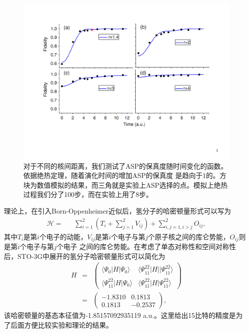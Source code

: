 \begin{figure}[htbp]
            \begin{center}
              \includegraphics[width= 0.8\columnwidth]{figures/nmrhydroasp.pdf}
              \caption{对于不同的核间距离，我们测试了ASP的保真度随时间变化的函数。依据绝热定理，随着演化时间的增加ASP的保真度
              是趋向于1的。方块为数值模拟的结果，而三角就是实验上ASP选择的点。模拟上绝热过程我们分了100步，而在实验上用了8步。}\label{nmrhydroasp}
            \end{center}
 \end{figure}
理论上，在引入Born-Oppenheimer近似后，氢分子的哈密顿量形式可以写为
 \begin{eqnarray}
\mathcal{H}=&&\sum\limits_{i=1}^2 (T_i+\sum\limits_{j=1}^2V_{ij})+\sum\limits_{i,j=1,i>j}^2O_{ij},
\end{eqnarray}
其中$T_i$是第$i$个电子的动能，$V_{ij}$是第$i$个电子与第$j$个原子核之间的库仑势能，$O_{ij}$则是第$i$个电子与第$j$个电子
之间的库仑势能。在考虑了单态对称性和空间对称性后，STO-3G中展开的氢分子哈密顿量形式可以简化为
\begin{eqnarray}
        H&=&
        \begin{pmatrix}
            \langle\Psi_0|H|\Psi_0\rangle & \langle\Psi_{1\bar{1}}^{2\bar{2}}|H||\Psi_{1\bar{1}}^{2\bar{2}}\rangle\\
            \langle\Psi_{1\bar{1}}^{2\bar{2}}|H|\Psi_0\rangle & \langle\Psi_{1\bar{1}}^{2\bar{2}}|H|\Psi_{1\bar{1}}^{2\bar{2}}\rangle
            \end{pmatrix}\nonumber\\
        &=& \begin{pmatrix}
            -1.8310 & 0.1813\\
            0.1813 & -0.2537
            \end{pmatrix},
\end{eqnarray}
该哈密顿量的基态本征值为-1.85157092935119 a.u.。这里给出15比特的精度是为了后面方便比较实验和理论的结果。

